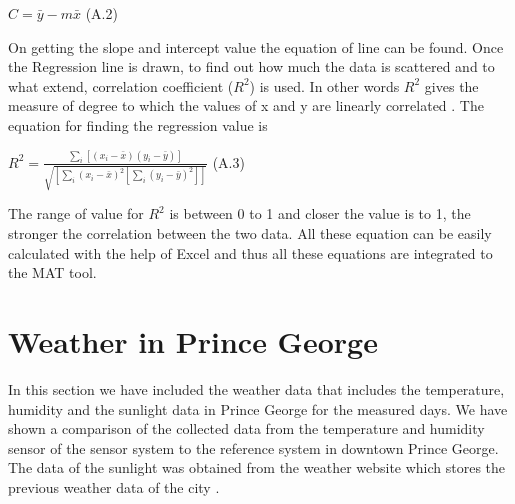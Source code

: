 \begin{center}
 
    { $ C = \bar{y}-m\bar{x}$}     \hspace{3cm}(A.2)

\end{center}


On getting the slope and intercept value the equation of line can be found. Once the Regression line is drawn, to find out how much the data is scattered and to what extend, correlation coefficient ($R^2$) is used. In other words $R^2$ gives the measure of  degree to which the values of x and y are linearly correlated \cite{Stone2001}. The equation for finding the regression value is

\begin{center}

    {\large $R^2 = \frac{\sum_i[(x_i-\bar x)(y_i-\bar y)]}{\sqrt{[\sum_i(x_i-\bar x)^2[\sum_i(y_i-\bar y)^2]]}}$ }  \hspace{2cm}(A.3)

\end{center}
The range of value for $R^2$ is between 0 to 1 and closer the value is to 1, the stronger the correlation between the two data.
All these equation can be easily calculated with the help of Excel and thus all these equations are integrated to the MAT tool.



\newpage

\section{Weather in Prince George}

In this section we have included the weather data that includes the temperature, humidity and the sunlight data in Prince George for the measured days. We have shown a comparison of the collected data from the temperature and humidity sensor of the sensor system to the reference system in downtown Prince George. The data of the sunlight was obtained from the weather website which stores the previous weather data of the city \cite{sunlight}.




